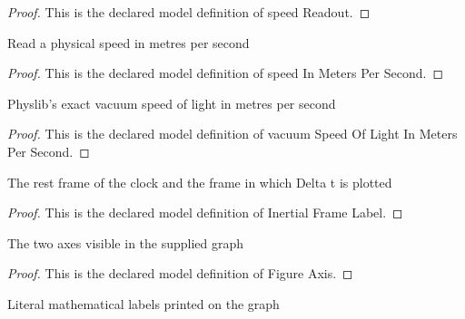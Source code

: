 \begin{proof}
  This is the declared model definition of speed Readout.
\end{proof}
\begin{definition}
  \label{def:physics:phyx-mini-0599:phyxminiproblems-problemphyxmini0599-speedinmeterspersecond}
  Read a physical speed in metres per second
\end{definition}
\begin{proof}
  This is the declared model definition of speed In Meters Per Second.
\end{proof}
\begin{definition}
  \label{def:physics:phyx-mini-0599:phyxminiproblems-problemphyxmini0599-vacuumspeedoflightinmeterspersecond}
  Physlib's exact vacuum speed of light in metres per second
\end{definition}
\begin{proof}
  This is the declared model definition of vacuum Speed Of Light In Meters Per Second.
\end{proof}
\begin{definition}
  \label{def:physics:phyx-mini-0599:phyxminiproblems-problemphyxmini0599-inertialframelabel}
  The rest frame of the clock and the frame in which Delta t is plotted
\end{definition}
\begin{proof}
  This is the declared model definition of Inertial Frame Label.
\end{proof}
\begin{definition}
  \label{def:physics:phyx-mini-0599:phyxminiproblems-problemphyxmini0599-figureaxis}
  The two axes visible in the supplied graph
\end{definition}
\begin{proof}
  This is the declared model definition of Figure Axis.
\end{proof}
\begin{definition}
  \label{def:physics:phyx-mini-0599:phyxminiproblems-problemphyxmini0599-figureaxislabel}
  Literal mathematical labels printed on the graph
\end{definition}

